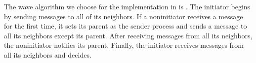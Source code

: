 \documentclass[letterpaper,10pt,english]{sphinxmanual}
\begin{document}
\sphinxAtStartPar
The wave algorithm we choose for the implementation in {\hyperref[\detokenize{docs/ShavitFrancez/algorithm:shavitfrancezterminationdetectionalgorithm}]{}}  is {\hyperref[\detokenize{docs/ShavitFrancez/algorithm:echoalgorithm}]{}} . The {\hyperref[\detokenize{docs/ShavitFrancez/algorithm:echoalgorithm}]{}} initiator begins by sending messages to all of its neighbors. If a non\sphinxhyphen{}initiator receives a message for the first time, it sets its parent as the sender process and sends a message to all its neighbors except its parent. After receiving messages from all its neighbors, the non\sphinxhyphen{}initiator notifies its parent. Finally, the initiator receives messages from all its neighbors and decides.
\end{document}
